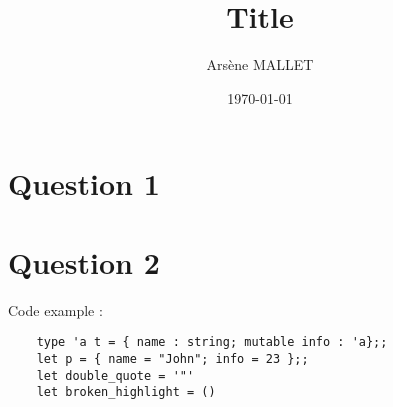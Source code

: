 \documentclass{article}
\title{Title}
\date{\today}
\author{Arsène MALLET}
\begin{document}
\begin{center}
    \huge{\@title}
\end{center}

\section*{Question 1}

\lipsum[1-2]

\section*{Question 2}

Code example : 
\begin{verbatim}
    type 'a t = { name : string; mutable info : 'a};;
    let p = { name = "John"; info = 23 };;
    let double_quote = '"'
    let broken_highlight = ()
\end{verbatim}
\end{document}

